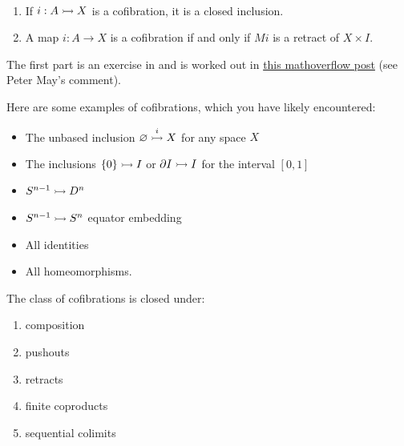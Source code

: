 \documentclass{article}[11pt]
\begin{document}
\begin{exercise} $\ $
\begin{enumerate}
	\item If $i : A \rightarrowtail X$ is a cofibration, it is a closed inclusion.
		\item A map $i: A \to X$ is a cofibration if and only if $Mi$ is a retract of $X \times I$.
\end{enumerate}
\end{exercise}

The first part is an exercise in \cite{may} and is worked out in \href{https://mathoverflow.net/questions/221183/in-cgwh-is-every-cofibration-an-inclusion-with-closed-image}{this mathoverflow post} (see Peter May's comment).

Here are some examples of cofibrations, which you have likely encountered:
\vspace{-1em}
\begin{itemize}\itemsep0em
	\item The unbased inclusion $\varnothing \overset{i}{\rightarrowtail} X$ for any space $X$
	\item The inclusions $\{0\} \rightarrowtail I$ or $\partial I \rightarrowtail I$ for the interval $[0,1]$
	\item $S^{n-1} \rightarrowtail D^n$
	\item $S^{n-1} \rightarrowtail S^n$ equator embedding
	\item All identities
	\item All homeomorphisms.
\end{itemize}

\begin{proposition} The class of cofibrations is closed under:
\vspace{-1em}
\begin{enumerate}\itemsep0em
	\item composition
	\item pushouts
	\item retracts
	\item finite coproducts
	\item sequential colimits
\end{enumerate}
\end{proposition}%
\end{document}

